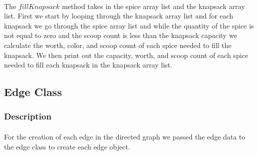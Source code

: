 \documentclass[letterpaper, 10pt,DIV=13]{scrartcl}
\numberwithin{equation}{section} %
\numberwithin{figure}{section} %
\numberwithin{table}{section} %
\begin{document}
\paragraph{} The $fillKnapsack$ method takes in the spice array list and the knapsack array list. First we start by looping through the knapsack array list and for each knapsack we go through the spice array list and while the quantity of the spice is not equal to zero and the scoop count is less than the knapsack capacity we calculate the worth, color, and scoop count of each spice needed to fill the knapsack. We then print out the capacity, worth, and scoop count of each spice needed to fill each knapsack in the knapsack array list. 

\subsection{Edge Class}

\subsubsection{Description}
\paragraph{} For the creation of each edge in the directed graph we passed the edge data to the edge class to create each edge object. 
\end{document}
